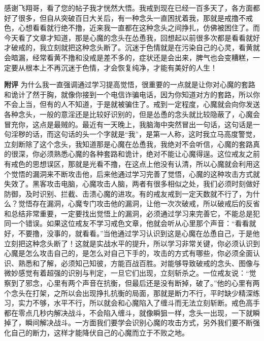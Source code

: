 \begin{case}
    感谢飞翔哥，看了您的帖子我才恍然大悟。我戒到现在已经一百多天了，各方面都好了很多，但自从突破百日大关后，有一种念头一直困扰着我，那就是戒撸不戒色，心想看看就行绝不撸，近来我一直都在这种念头之间挣扎，仿佛被困住了。而今天看了文章才知道，那是心魔的念头在怂恿我，回想起以前很多次都是看看就好才破戒的，我立刻就把这种念头断了。沉迷于色情就是在污染自己的心灵，看黄就会暗漏，经常看黄不撸和没戒是差不多的，症状还是会出来，脾气也会变糟糕，一定要从根本上不再沉迷于色情，才会恢复纯净，才能有美好的人生！

    \textbf{附评} 为什么我一直强调通过学习提高觉悟，很重要的一点就是让你对心魔的套路和诡计了然于胸，就像你接到一个电信诈骗电话，因为你知道对方的套路，所以你不会上当，但有的人不知道，于是就被骗住了。戒到一定程度，心魔就会向你发送各种念头，一般的意淫还是比较好识别的，但是怂恿的念头就比较隐蔽了，心魔会冒充你，这点是最贼的。最近有一天晚上，我脑海中突然冒出一句话，这句话是一句淫秽的话，而这句话的头一个字就是“我”，是第一人称，这时我立马高度警觉，立刻断除了这个念头，我知道那是心魔在怂恿我，我绝对不会听信，心魔的套路真的很深，你必须熟悉心魔的各种套路和诡计，绝对不能让心魔得逞。这位戒友之前有戒色的思想误区，那就是光看不撸，在这点上他没有认清，所以心魔就会利用这个觉悟的漏洞来不断攻击他，后来他通过学习完善了觉悟，心魔的这种攻击方式就失效了。黑客攻击电脑，心魔攻击人脑，两者有很多相似之处，我们必须时刻做好防御，及时识别、拦截、击溃心魔的进攻。有的戒友戒到一定天数就不行了，为什么？觉悟存在漏洞，心魔专门攻击他的漏洞，让他一次次破戒，所以破戒后的反省和总结非常重要，一定要找出觉悟上的漏洞，必须通过学习来完善它，不能总是犯同一个错误。如果这位戒友不学习戒色文章，他就会听从心里那个声音：“看看就好，不要撸，没事的，就看看。”当他通过学习认识到这是心魔在怂恿自己，于是他立刻把这种念头断了！这就是实战水平的提升，所以学习非常关键，你必须认识到心魔是怎么攻击自己的，是怎么对自己下手的，攻击的方式有哪些，你必须全面认识、熟悉和了解，必须知己知彼，方能百战百胜。对能够导致破戒的念头、图像与微妙感觉有着超强的识别与判定，一旦它们出现，立刻斩杀之。一位戒友说：“觉察到了邪念，心里有两个声音在抗衡，但最后还是没有断掉，破了。”他的心里有两个念头在打架，之所以会出现挣扎抗衡的局面，那就是断力不行，平时缺少精深练习，实力不够，水平不行，所以就会和心魔陷入了缠斗而无法立刻斩断。戒色高手都在零点几秒内解决战斗，不会陷入缠斗，就像瞬狙一样，念头一出现，一下就瞬掉了，瞬间解决战斗。一方面我们要学会识别心魔的攻击方式，另外我们要不断强化自己的断力，这样才能降伏自己的心魔而立于不败之地。
\end{case}

